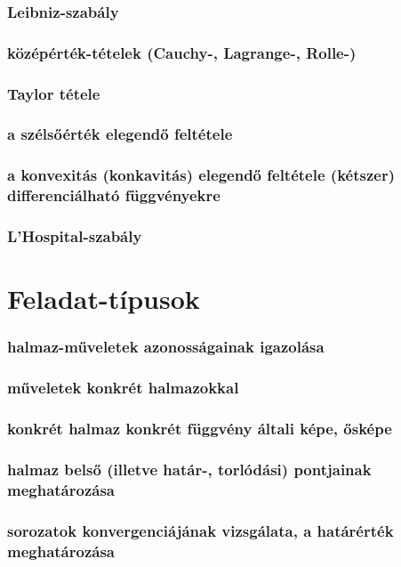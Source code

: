 \documentclass[12pt]{article}
\begin{document}
\subsubsection{Leibniz-szabály}
\subsubsection{középérték-tételek (Cauchy-, Lagrange-, Rolle-)}
\subsubsection{Taylor tétele}
\subsubsection{a
szélsőérték elegendő feltétele}
\subsubsection{a konvexitás (konkavitás) elegendő feltétele (kétszer)
differenciálható függvényekre}
\subsubsection{L’Hospital-szabály}


\section{Feladat-típusok}

\subsubsection{halmaz-műveletek azonosságainak igazolása}
\subsubsection{műveletek konkrét halmazokkal}
\subsubsection{konkrét halmaz konkrét függvény általi képe, ősképe}
\subsubsection{halmaz belső (illetve határ-, torlódási) pontjainak meghatározása}
\subsubsection{sorozatok konvergenciájának vizsgálata, a határérték meghatározása}
\end{document}
